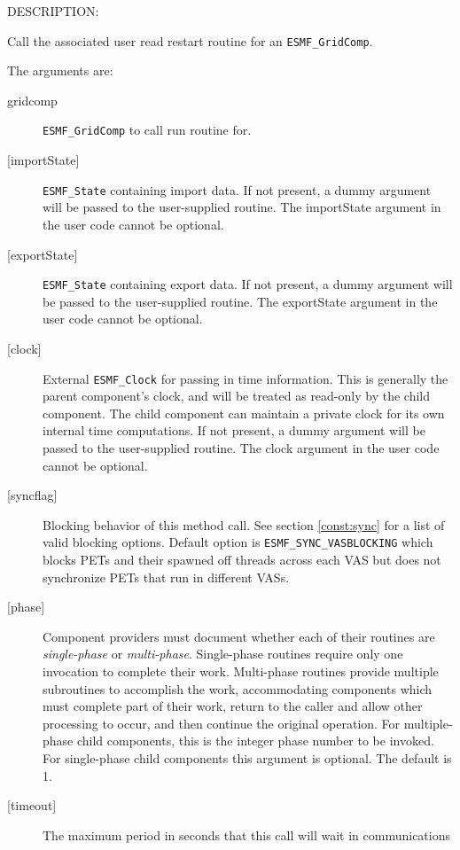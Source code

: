 {\sf DESCRIPTION:\\ }


   Call the associated user read restart routine for
   an {\tt ESMF\_GridComp}.
  
   The arguments are:
   \begin{description}
   \item[gridcomp]
     {\tt ESMF\_GridComp} to call run routine for.
   \item[{[importState]}]
     {\tt ESMF\_State} containing import data. If not present, a dummy
     argument will be passed to the user-supplied routine.  The
     importState argument in the user code cannot be optional.
   \item[{[exportState]}]
     {\tt ESMF\_State} containing export data. If not present, a dummy
     argument will be passed to the user-supplied routine.  The
     exportState argument in the user code cannot be optional.
   \item[{[clock]}]
     External {\tt ESMF\_Clock} for passing in time information.
     This is generally the parent component's clock, and will be treated
     as read-only by the child component.  The child component can maintain
     a private clock for its own internal time computations. If not present, a dummy
     argument will be passed to the user-supplied routine.  The
     clock argument in the user code cannot be optional.
   \item[{[syncflag]}]
     Blocking behavior of this method call. See section \ref{const:sync}
     for a list of valid blocking options. Default option is
     {\tt ESMF\_SYNC\_VASBLOCKING} which blocks PETs and their spawned off threads
     across each VAS but does not synchronize PETs that run in different VASs.
   \item[{[phase]}]
     Component providers must document whether each of their
     routines are {\em single-phase} or {\em multi-phase}.
     Single-phase routines require only one invocation to complete
     their work.
     Multi-phase routines provide multiple subroutines to accomplish
     the work, accommodating components which must complete part of their
     work, return to the caller and allow other processing to occur,
     and then continue the original operation.
     For multiple-phase child components, this is the integer phase
     number to be invoked.
     For single-phase child components this argument is optional. The default is
     1.
   \item[{[timeout]}]
     The maximum period in seconds that this call will wait in communications

\end{description}

